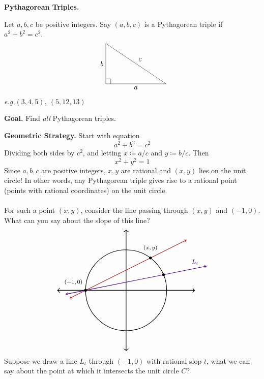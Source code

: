 \vspace*{1em}

{\bf Pythagorean Triples.}
\begin{definition}
Let $a,b,c$ be positive integers. Say $(a,b,c)$ is a Pythagorean triple if $a^2 + b^2 = c^2$.
\[\begin{tikzpicture}
        \draw[]  (0, 0) coordinate (A) 
        -- node[left] {$b$} (0,2) coordinate (C) 
        -- node[above right] {$c$} (3,0) coordinate (B) 
        -- node[below] {$a$}  (-0.007,0);
       \draw (0,7pt) -- ++(7pt,0) -- ++(0,-7pt);
      \end{tikzpicture}\]
\emph{e.g.}\quad $(3,4,5),\ (5,12,13)$
\end{definition}

\vspace*{1.5em}

{\bf Goal.} Find \emph{all} Pythagorean triples.

\vspace*{2em}

{\bf Geometric Strategy.} Start with equation
\[a^2 + b^2  = c^2\]
Dividing both sides by $c^2$, and letting $x \coloneqq a/c$ and $y \coloneqq b/c$. Then
\[x^2 + y^2 = 1\]
Since $a,b,c$ are positive integers, $x,y$ are rational and $(x,y)$ lies on the unit circle! In other words, any Pythagorean triple gives rise to a rational point (points with rational coordinates) on the unit circle.\\
\\
For such a point $(x,y)$, consider the line passing through $(x,y)$ and $(-1,0)$. What can you say about the slope of this line?
\[\begin{tikzpicture}[scale=2]
    \draw[<->,thick] (-1.7,0)--(1.7,0);
    \draw[<->,thick] (0,-1.5)--(0,1.5);
    \draw[thick](0,0) circle (1);
	\draw[<->,thick,>=stealth, color=firebrick] (-1.4,-0.2)--(1.5,1.25);   
	\draw[<->,thick,>=stealth, color=indigo] (-1.5,-0.1)--(2,0.6);   
    \fill (-1,0) circle (1pt);
    \fill (0.6,0.8) circle (1pt);
    \fill (0.923076923,0.384615385) circle (1pt);
    \node[] at (-1.3,0.2) {\footnotesize$(-1,0)$};
    \node[] at (0.6,1.05) {\footnotesize$(x,y)$};
    \node[] at (1.7,0.7) {\color{indigo} \small $L_t$};
\end{tikzpicture}\]
Suppose we draw a line $L_t$ through $(-1,0)$ with rational slop $t$, what we can say about the point at which it intersects the unit circle $C$?

\vspace*{1em}


